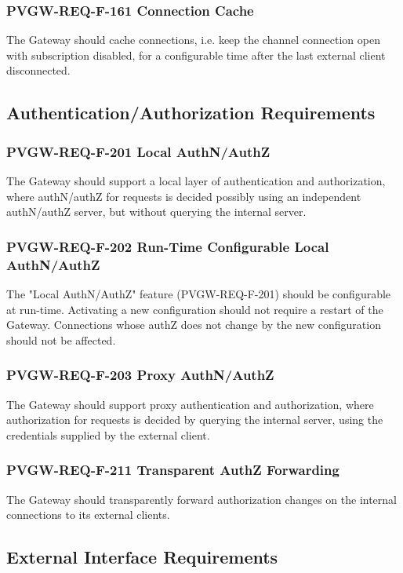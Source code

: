 \documentclass[11pt
  , a4paper
  , article
  , oneside
]{memoir}
\begin{document}
\subsubsection{PVGW-REQ-F-161 Connection Cache}
The Gateway should cache connections, i.e. keep the channel connection open with subscription disabled, for a configurable time after the last external client disconnected.


\subsection{Authentication/Authorization Requirements}

\subsubsection{PVGW-REQ-F-201 Local AuthN/AuthZ}
The Gateway should support a local layer of authentication and authorization, where authN/authZ for requests is decided possibly using an independent authN/authZ server, but without querying the internal server.

\subsubsection{PVGW-REQ-F-202 Run-Time Configurable Local AuthN/AuthZ}
The "Local AuthN/AuthZ" feature (PVGW-REQ-F-201) should be configurable at run-time. Activating a new configuration should not require a restart of the Gateway. Connections whose authZ does not change by the new configuration should not be affected.

\subsubsection{PVGW-REQ-F-203 Proxy AuthN/AuthZ}
The Gateway should support proxy authentication and authorization, where authorization for requests is decided by querying the internal server, using the credentials supplied by the external client.

\subsubsection{PVGW-REQ-F-211 Transparent AuthZ Forwarding}
The Gateway should transparently forward authorization changes on the internal connections to its external clients.

\subsection{External Interface Requirements}
\end{document}

